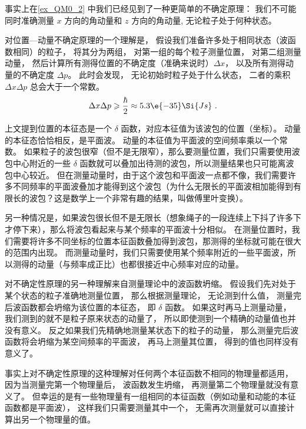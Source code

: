 事实上在\autoref{ex_QM0_2} 中我们已经见到了一种更简单的不确定原理： 我们不可能同时准确测量 $x$ 方向的角动量和 $z$ 方向的角动量, 无论粒子处于何种状态。

对位置—动量不确定原理的一个理解是， 假设我们准备许多处于相同状态（波函数相同）的粒子， 将其分为两组， 对第一组的每个粒子测量位置， 对第二组测量动量， 然后计算所有测得位置的不确定度（准确来说时）$\Delta x$， 以及所有测得动量的不确定度 $\Delta p$。 此时会发现， 无论初始时粒子处于什么状态， 二者的乘积 $\Delta x \Delta p$ 总会大于一个常数。
\begin{equation}
\Delta x \Delta p \geqslant \frac{\hbar}{2} \approx 5.3\e{-35} \Si{Js}~.
\end{equation}

上文提到位置的本征态是一个 $\delta$ 函数，对应本征值为该波包的位置（坐标）。 动量的本征态恰恰相反，是平面波。 动量的本征值为平面波的空间频率乘以一个常数。 如果粒子的波包很窄（但不是无限窄），那么要测量位置，我们只需要使用波包中心附近的一些 $\delta$ 函数就可以叠加出待测的波包，所以测量结果也只可能离波包中心较近。 但在测量动量时，由于这个波包和平面波一点都不像，我们需要许多不同频率的平面波叠加才能得到这个波包（为什么无限长的平面波相加能得到有限长的波包？这是数学上一个非常有趣的结果，叫做傅里叶变换）。

另一种情况是，如果波包很长但不是无限长（想象绳子的一段连续上下抖了许多下才停下来），那么将波包看起来与某个频率的平面波十分相似。 在测量位置时，我们需要将许多不同坐标的位置本征函数叠加得到波包，那测得的坐标就可能在很大的范围内出现。 而测量动量时，我们只需要使用某个频率附近的一些平面波，所以测得的动量（与频率成正比）也都很接近中心频率对应的动量。

对不确定性原理的另一种理解来自测量理论中的波函数坍缩。 假设我们先对处于某个状态的粒子准确地测量位置， 那么根据测量理论， 无论测到什么值， 测量完后波函数都会坍缩为该位置的本征态， 即 $\delta$ 函数。 如果这时再马上测量动量， 我们测到的就不是粒子原来状态的动量了， 所以即使测到一个精确的动量值也并没有意义。 反之如果我们先精确地测量某状态下的粒子的动量， 那么测量完后波函数将会坍缩为某空间频率的平面波， 再马上测量其位置， 得到的值也同样没有意义了。

事实上对不确定性原理的这种理解对任何两个本征函数不相同的物理量都适用， 因为当测量完第一个物理量后， 波函数发生坍缩， 再测量第二个物理量就没有意义了。 但幸运的是有一些物理量有一组相同的本征函数（例如动量和动能的本征函数都是平面波）， 这样我们只需要测量其中一个， 无需再次测量就可以直接计算出另一个物理量的值。
